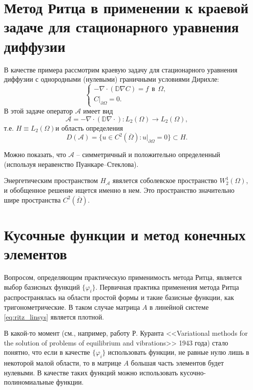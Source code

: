 \documentclass[a4paper, 11pt]{article}
\begin{document}
\section{Метод Ритца в применении к краевой задаче для стационарного уравнения диффузии}
В качестве примера рассмотрим краевую задачу для стационарного уравнения диффузии с однородными (нулевыми) граничными условиями Дирихле:
\begin{equation}
\begin{cases}
-\nabla\cdot\left(\mathbb{D}\nabla C\right) = f~~\text{в}~~\Omega,\\
C|_{\partial \Omega} = 0.
\end{cases}
\end{equation}
В этой задаче оператор $\mathcal{A}$ имеет вид
\begin{equation}
\mathcal{A} = -\nabla\cdot\left(\mathbb{D}\nabla \cdot\right): L_2(\Omega) \rightarrow L_2(\Omega),
\end{equation}
т.е. $H\equiv L_2(\Omega)$и область определения
\begin{equation}
D(\mathcal{A}) = \{u \in C^2(\overline{\Omega}): u|_{\partial\Omega}=0\} \subset H.
\end{equation}

Можно показать, что $\mathcal{A}$ -- симметричный и положительно определенный (используя неравенство Пуанкаре--Стеклова).

Энергетическим пространством $H_\mathcal{A}$ явялется соболевское пространство $W_2^1\left(\Omega\right)$, и обобщенное решение ищется именно в нем. Это пространство значительно шире пространства $C^2(\overline{\Omega})$.

\section{Кусочные функции и метод конечных элементов} 
Вопросом, определяющим практическую применимость метода Ритца, является выбор базисных функций $\{\varphi_i\}$. Первичная практика применения метода Ритца распространялась на области простой формы и такие базисные функции, как тригонометрические. В таком случае матрица $A$ в линейной системе \eqref{eq:ritz_linsys} является плотной.

В какой-то момент (см., например, работу Р. Куранта <<Variational methods for the solution of problems of equilibrium and vibrations>> 1943 года) стало понятно, что если в качестве $\{\varphi_i\}$ использовать функции, не равные нулю лишь в некоторой малой области, то в матрице $A$ большая часть элементов будет нулевыми. В качестве таких функций можно использовать кусочно-полиномиальные функции.
\end{document}
